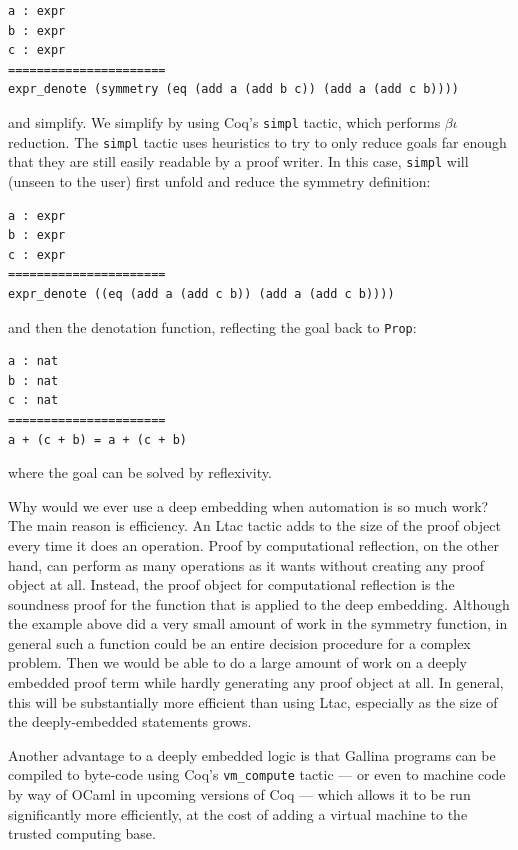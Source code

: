 \documentclass{puthesis}
\begin{document}
\begin{lstlisting}
a : expr
b : expr
c : expr
======================
expr_denote (symmetry (eq (add a (add b c)) (add a (add c b))))  
\end{lstlisting}

and simplify. We simplify by using Coq's \lstinline|simpl| tactic,
which performs $\beta\iota$ reduction. The \lstinline|simpl| tactic uses
heuristics to try to only reduce goals far enough that they are still
easily readable by a proof writer. In this case, \lstinline|simpl| 
will (unseen to the user) first unfold and reduce the symmetry
definition:

\begin{lstlisting}
a : expr
b : expr
c : expr
======================
expr_denote ((eq (add a (add c b)) (add a (add c b))))  
\end{lstlisting}

\noindent and then the denotation function, reflecting the goal back
to \lstinline|Prop|:

\begin{lstlisting}
a : nat
b : nat
c : nat
======================
a + (c + b) = a + (c + b) 
\end{lstlisting}

\noindent where the goal can be solved by reflexivity.

Why would we ever use a deep embedding when automation is so much
work? The main reason is efficiency. An Ltac tactic adds to the size
of the proof object every time it does an operation. Proof by
computational reflection, on the other hand, can perform as many
operations as it wants without creating any proof object at
all. Instead, the proof object for computational reflection is the
soundness proof for the function that is applied to the deep
embedding. Although the example above did a very small amount of work
in the symmetry function, in general such a function could be an
entire decision procedure for a complex problem. Then we would be able
to do a large amount of work on a deeply embedded proof term while
hardly generating any proof object at all. In general, this will be
substantially more efficient than using Ltac, especially as the size
of the deeply-embedded statements grows.

Another advantage to a deeply embedded logic is that Gallina programs
can be compiled to byte-code using Coq's \lstinline|vm_compute|
tactic --- or even to machine code by way of OCaml in upcoming versions
of Coq --- which allows it to be run significantly more efficiently, at
the cost of adding a virtual machine to the trusted computing base.
\end{document}

